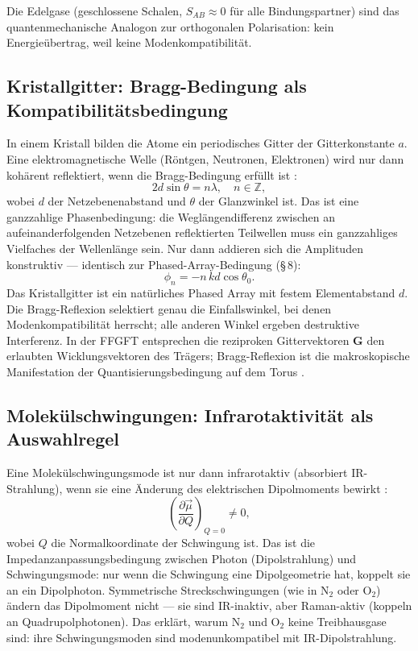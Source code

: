 Die Edelgase (geschlossene Schalen, $S_{AB}\approx 0$ für alle
Bindungspartner) sind das quantenmechanische Analogon zur
orthogonalen Polarisation: kein Energieübertrag, weil keine
Modenkompatibilität.

\subsection*{Kristallgitter: Bragg-Bedingung als Kompatibilitätsbedingung}

In einem Kristall bilden die Atome ein periodisches Gitter der
Gitterkonstante $a$. Eine elektromagnetische Welle (Röntgen, Neutronen,
Elektronen) wird nur dann kohärent reflektiert, wenn die
Bragg-Bedingung erfüllt ist \cite{Kittel2005,Ashcroft1976}:
\[
  2d\sin\theta = n\lambda, \quad n \in \mathbb{Z},
\]
wobei $d$ der Netzebenenabstand und $\theta$ der Glanzwinkel ist.
Das ist eine ganzzahlige Phasenbedingung: die Weglängendifferenz
zwischen an aufeinanderfolgenden Netzebenen reflektierten Teilwellen
muss ein ganzzahliges Vielfaches der Wellenlänge sein. Nur dann
addieren sich die Amplituden konstruktiv --- identisch zur
Phased-Array-Bedingung (§\,8):
\[
  \phi_n = -n\,kd\cos\theta_0.
\]
Das Kristallgitter ist ein natürliches Phased Array mit festem
Elementabstand $d$. Die Bragg-Reflexion selektiert genau die
Einfallswinkel, bei denen Modenkompatibilität herrscht; alle anderen
Winkel ergeben destruktive Interferenz. In der FFGFT entsprechen
die reziproken Gittervektoren $\mathbf{G}$ den erlaubten
Wicklungsvektoren des Trägers; Bragg-Reflexion ist die makroskopische
Manifestation der Quantisierungsbedingung auf dem Torus \SM.

\subsection*{Molekülschwingungen: Infrarotaktivität als Auswahlregel}

Eine Molekülschwingungsmode ist nur dann infrarotaktiv (absorbiert
IR-Strahlung), wenn sie eine Änderung des elektrischen Dipolmoments
bewirkt \cite{Atkins2010,Wilson1955}:
\[
  \left(\frac{\partial \vec{\mu}}{\partial Q}\right)_{Q=0} \neq 0,
\]
wobei $Q$ die Normalkoordinate der Schwingung ist. Das ist die
Impedanzanpassungsbedingung zwischen Photon (Dipolstrahlung) und
Schwingungsmode: nur wenn die Schwingung eine Dipolgeometrie hat,
koppelt sie an ein Dipolphoton. Symmetrische Streckschwingungen (wie
in N$_2$ oder O$_2$) ändern das Dipolmoment nicht --- sie sind
IR-inaktiv, aber Raman-aktiv (koppeln an Quadrupolphotonen). Das
erklärt, warum N$_2$ und O$_2$ keine Treibhausgase sind: ihre
Schwingungsmoden sind modenunkompatibel mit IR-Dipolstrahlung.

